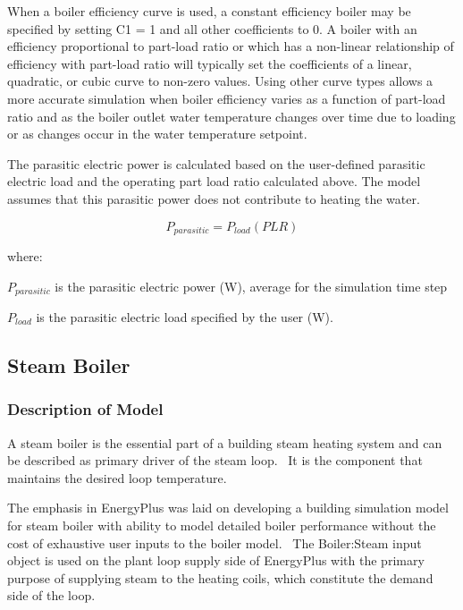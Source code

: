 When a boiler efficiency curve is used, a constant efficiency boiler may be specified by setting C1 = 1 and all other coefficients to 0. A boiler with an efficiency proportional to part-load ratio or which has a non-linear relationship of efficiency with part-load ratio will typically set the coefficients of a linear, quadratic, or cubic curve to non-zero values. Using other curve types allows a more accurate simulation when boiler efficiency varies as a function of part-load ratio and as the boiler outlet water temperature changes over time due to loading or as changes occur in the water temperature setpoint.

The parasitic electric power is calculated based on the user-defined parasitic electric load and the operating part load ratio calculated above. The model assumes that this parasitic power does not contribute to heating the water.

\begin{equation}
{P_{parasitic}} = {P_{load}}\left( {PLR} \right)
\end{equation}

where:

\({P_{parasitic}}\) is the parasitic electric power (W), average for the simulation time step

\({P_{load}}\) is the parasitic electric load specified by the user (W).

\subsection{Steam Boiler}\label{steam-boiler}

\subsubsection{Description of Model}\label{description-of-model}

A steam boiler is the essential part of a building steam heating system and can be described as primary driver of the steam loop.~ It is the component that maintains the desired loop temperature.

The emphasis in EnergyPlus was laid on developing a building simulation model for steam boiler with ability to model detailed boiler performance without the cost of exhaustive user inputs to the boiler model.~ The Boiler:Steam input object is used on the plant loop supply side of EnergyPlus with the primary purpose of supplying steam to the heating coils, which constitute the demand side of the loop.

